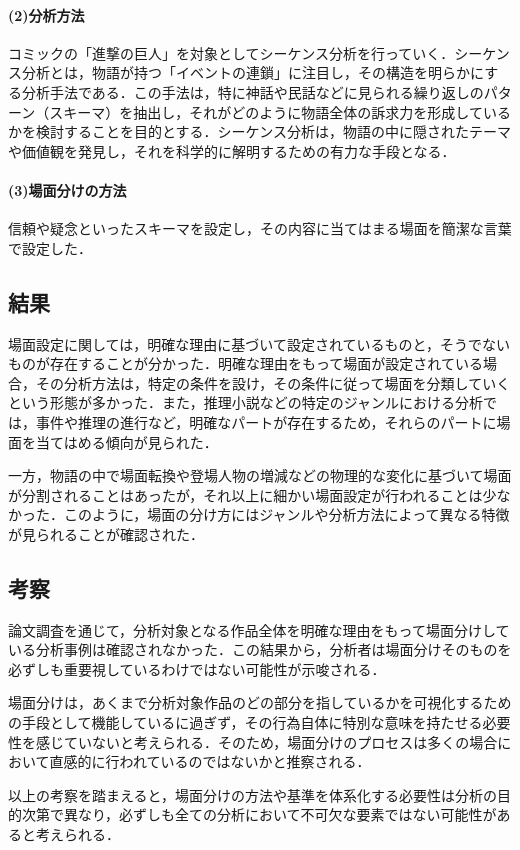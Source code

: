 \paragraph*{(2)分析方法}
コミックの「進撃の巨人」を対象としてシーケンス分析を行っていく．シーケンス分析とは，物語が持つ「イベントの連鎖」に注目し，その構造を明らかにする分析手法である．この手法は，特に神話や民話などに見られる繰り返しのパターン（スキーマ）を抽出し，それがどのように物語全体の訴求力を形成しているかを検討することを目的とする．シーケンス分析は，物語の中に隠されたテーマや価値観を発見し，それを科学的に解明するための有力な手段となる．
\paragraph*{(3)場面分けの方法}
信頼や疑念といったスキーマを設定し，その内容に当てはまる場面を簡潔な言葉で設定した．

\subsection{結果}
場面設定に関しては，明確な理由に基づいて設定されているものと，そうでないものが存在することが分かった．明確な理由をもって場面が設定されている場合，その分析方法は，特定の条件を設け，その条件に従って場面を分類していくという形態が多かった．また，推理小説などの特定のジャンルにおける分析では，事件や推理の進行など，明確なパートが存在するため，それらのパートに場面を当てはめる傾向が見られた．

一方，物語の中で場面転換や登場人物の増減などの物理的な変化に基づいて場面が分割されることはあったが，それ以上に細かい場面設定が行われることは少なかった．このように，場面の分け方にはジャンルや分析方法によって異なる特徴が見られることが確認された．

\subsection{考察}
論文調査を通じて，分析対象となる作品全体を明確な理由をもって場面分けしている分析事例は確認されなかった．この結果から，分析者は場面分けそのものを必ずしも重要視しているわけではない可能性が示唆される．

場面分けは，あくまで分析対象作品のどの部分を指しているかを可視化するための手段として機能しているに過ぎず，その行為自体に特別な意味を持たせる必要性を感じていないと考えられる．そのため，場面分けのプロセスは多くの場合において直感的に行われているのではないかと推察される．

以上の考察を踏まえると，場面分けの方法や基準を体系化する必要性は分析の目的次第で異なり，必ずしも全ての分析において不可欠な要素ではない可能性があると考えられる．

